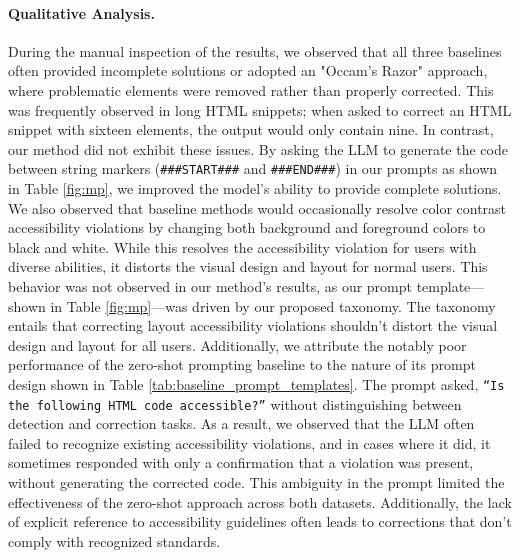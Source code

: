 \documentclass[sigconf, nonacm]{acmart}
\newcommand{\method}{\emph{AccessGuru}}
\begin{document}
\paragraph{Qualitative Analysis.}  During the manual inspection of the results, we observed that all three baselines often provided incomplete solutions or adopted an "Occam's Razor" approach, where problematic elements were removed rather than properly corrected. This was frequently observed in long HTML snippets; when asked to correct an HTML snippet with sixteen elements, the output would only contain nine. In contrast, our method did not exhibit these issues. By asking the LLM to generate the code between string markers (\texttt{\#\#\#START\#\#\#} and \texttt{\#\#\#END\#\#\#}) in our prompts as shown in Table \ref{fig:mp}, we improved the model's ability to provide complete solutions. We also observed that baseline methods would occasionally resolve color contrast accessibility violations by changing both background and foreground colors to black and white. While this resolves the accessibility violation for users with diverse abilities, it distorts the visual design and layout for normal users. This behavior was not observed in our method's results, as our prompt template—shown in Table \ref{fig:mp}—was driven by our proposed taxonomy. The taxonomy entails that correcting layout accessibility violations shouldn't distort the visual design and layout for all users. Additionally, we attribute the notably poor performance of the zero-shot prompting baseline \cite{DBLP:conf/ccnc/DelnevoAM24} to the nature of its prompt design shown in Table \ref{tab:baseline_prompt_templates}. The prompt asked, \texttt{“Is the following HTML code accessible?”} without distinguishing between detection and correction tasks. As a result, we observed that the LLM often failed to recognize existing accessibility violations, and in cases where it did, it sometimes responded with only a confirmation that a violation was present, without generating the corrected code. This ambiguity in the prompt limited the effectiveness of the zero-shot approach across both datasets. Additionally, the lack of explicit reference to accessibility guidelines often leads to corrections that don't comply with recognized standards. 




\end{document}
